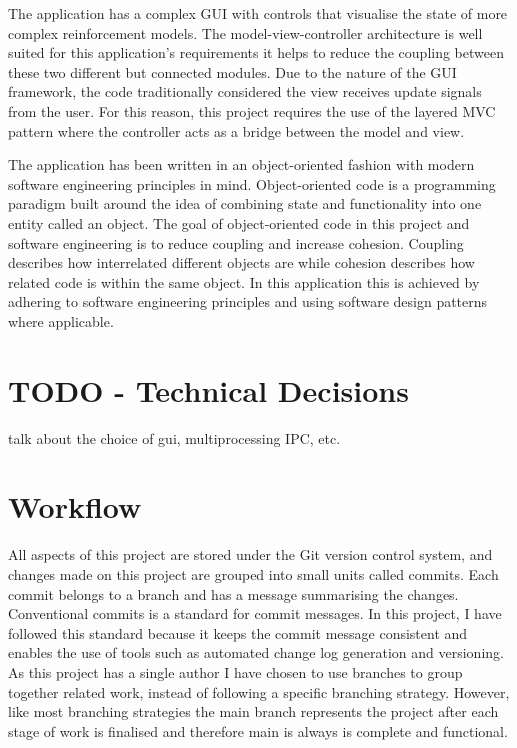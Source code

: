 \documentclass[]{final_report}
\begin{document}
The application has a complex GUI with controls that visualise the state of more complex reinforcement models. The model-view-controller architecture is well suited for this application's requirements it helps to reduce the coupling between these two different but connected modules. Due to the nature of the GUI framework, the code traditionally considered the view receives update signals from the user. For this reason, this project requires the use of the layered MVC pattern \cite{webMVC}\cite{gamesMVC} where the controller acts as a bridge between the model and view.

The application has been written in an object-oriented fashion with modern software engineering principles in mind\cite{van2008software}. Object-oriented code is a programming paradigm built around the idea of combining state and functionality into one entity called an object. The goal of object-oriented code in this project and software engineering is to reduce coupling and increase cohesion. Coupling describes how interrelated different objects are while cohesion describes how related code is within the same object. In this application this is achieved by adhering to software engineering principles \cite{softwareEngineringPrinciples} and using software design patterns where applicable.

\section{TODO - Technical Decisions}

talk about the choice of gui, multiprocessing IPC, etc.

\pagebreak
\section{Workflow}


All aspects of this project are stored under the Git version control system, and changes made on this project are grouped into small units called commits. Each commit belongs to a branch and has a message summarising the changes. Conventional commits \cite{conventionalCommitsOnline} is a standard for commit messages. In this project, I have followed this standard because it keeps the commit message consistent and enables the use of tools such as automated change log generation and versioning. As this project has a single author I have chosen to use branches to group together related work, instead of following a specific branching strategy. However, like most branching strategies the main branch represents the project after each stage of work is finalised and therefore main is always is complete and functional. 
\end{document}
